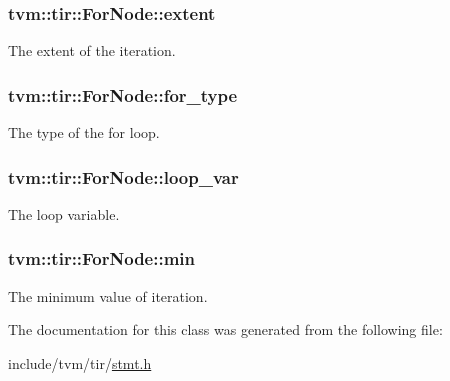 \subsubsection[{\texorpdfstring{extent}{extent}}]{ tvm\+::tir\+::\+For\+Node\+::extent}\hypertarget{classtvm_1_1tir_1_1ForNode_ab54798257255b682a1aad74cec33e070}{}\label{classtvm_1_1tir_1_1ForNode_ab54798257255b682a1aad74cec33e070}


The extent of the iteration. 

\subsubsection[{\texorpdfstring{for\+\_\+type}{for_type}}]{ tvm\+::tir\+::\+For\+Node\+::for\+\_\+type}\hypertarget{classtvm_1_1tir_1_1ForNode_a16c251793b50476f3e61ad529c5a8986}{}\label{classtvm_1_1tir_1_1ForNode_a16c251793b50476f3e61ad529c5a8986}


The type of the for loop. 

\subsubsection[{\texorpdfstring{loop\+\_\+var}{loop_var}}]{ tvm\+::tir\+::\+For\+Node\+::loop\+\_\+var}\hypertarget{classtvm_1_1tir_1_1ForNode_a7dbf66bdcf8ed397321517f0915a0946}{}\label{classtvm_1_1tir_1_1ForNode_a7dbf66bdcf8ed397321517f0915a0946}


The loop variable. 

\subsubsection[{\texorpdfstring{min}{min}}]{ tvm\+::tir\+::\+For\+Node\+::min}\hypertarget{classtvm_1_1tir_1_1ForNode_a1d1aa2006328bd84e4911f6d43ceca5c}{}\label{classtvm_1_1tir_1_1ForNode_a1d1aa2006328bd84e4911f6d43ceca5c}


The minimum value of iteration. 



The documentation for this class was generated from the following file\+:\begin{DoxyCompactItemize}
\item 
include/tvm/tir/\hyperlink{stmt_8h}{stmt.\+h}\end{DoxyCompactItemize}
